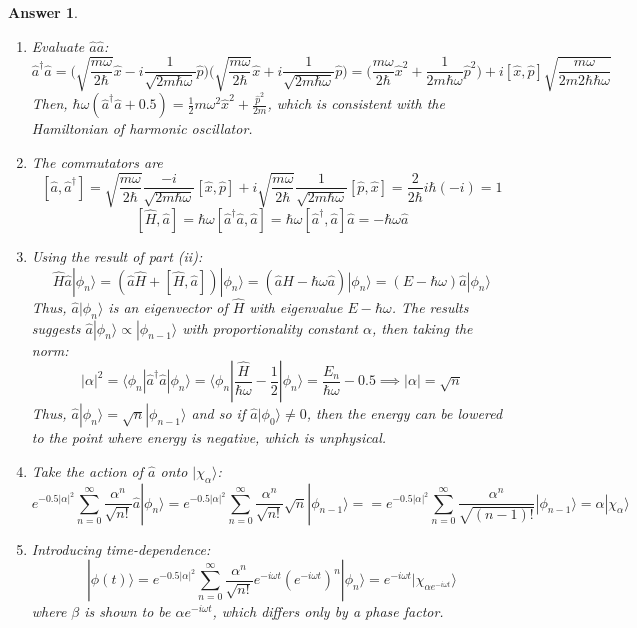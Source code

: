 \documentclass[a4paper]{article}
\newtheorem{ans}{Answer}[subsection]
\theoremstyle{new}
\begin{document}
\begin{ans}\leavevmode
\begin{enumerate}[label=(\roman*)]
\item Evaluate $\hat{a}\hat{a}$:
$$\hat{a}^\dag\hat{a}=\bigg(\sqrt{\frac{m\omega}{2\hbar}}\hat{x}-i\frac{1}{\sqrt{2m\hbar\omega}}\hat{p}\bigg)\bigg(\sqrt{\frac{m\omega}{2\hbar}}\hat{x}+i\frac{1}{\sqrt{2m\hbar\omega}}\hat{p}\bigg)=\bigg(\frac{m\omega}{2\hbar}\hat{x}^2+\frac{1}{2m\hbar\omega}\hat{p}^2\bigg)+i[\hat{x},\hat{p}]\sqrt{\frac{m\omega}{2m2\hbar\hbar\omega}}$$
Then, $\hbar\omega(\hat{a}^\dag\hat{a}+0.5)=\frac{1}{2}m\omega^2\hat{x}^2+\frac{\hat{p}^2}{2m}$, which is consistent with the Hamiltonian of harmonic oscillator.
\item The commutators are
$$[\hat{a},\hat{a}^\dag]=\sqrt{\frac{m\omega}{2\hbar}}\frac{-i}{\sqrt{2m\hbar\omega}}[\hat{x},\hat{p}]+i\sqrt{\frac{m\omega}{2\hbar}}\frac{1}{\sqrt{2m\hbar\omega}}[\hat{p},\hat{x}]=\frac{2}{2\hbar}i\hbar(-i)=1$$
$$[\hat{H},\hat{a}]=\hbar\omega[\hat{a}^\dag\hat{a},\hat{a}]=\hbar\omega[\hat{a}^\dag,\hat{a}]\hat{a}=-\hbar\omega\hat{a}$$
\item Using the result of part (ii):
$$\hat{H}\hat{a}|\phi_n\rangle=(\hat{a}\hat{H}+[\hat{H},\hat{a}])|\phi_n\rangle=(\hat{a}\hat{H}-\hbar\omega\hat{a})|\phi_n\rangle=(E-\hbar\omega)\hat{a}|\phi_n\rangle$$
Thus, $\hat{a}|\phi_n\rangle$ is an eigenvector of $\hat{H}$ with eigenvalue $E-\hbar\omega$. The results suggests $\hat{a}|\phi_n\rangle\propto|\phi_{n-1}\rangle$ with proportionality constant $\alpha$, then taking the norm:
$$|\alpha|^2=\langle \phi_n|\hat{a}^\dag\hat{a}|\phi_n\rangle=\langle \phi_n|\frac{\hat{H}}{\hbar\omega}-\frac{1}{2}|\phi_n\rangle=\frac{E_n}{\hbar\omega}-0.5\implies|\alpha|=\sqrt{n}$$
Thus, $\hat{a}|\phi_n\rangle=\sqrt{n}|\phi_{n-1}\rangle$ and so if $\hat{a}|\phi_0\rangle\neq0$, then the energy can be lowered to the point where energy is negative, which is unphysical.
\item Take the action of $\hat{a}$ onto $|\chi_\alpha\rangle$:
$$e^{-0.5|\alpha|^2}\sum_{n=0}^\infty\frac{\alpha^n}{\sqrt{n!}}\hat{a}|\phi_n\rangle=e^{-0.5|\alpha|^2}\sum_{n=0}^\infty\frac{\alpha^n}{\sqrt{n!}}\sqrt{n}|\phi_{n-1}\rangle==e^{-0.5|\alpha|^2}\sum_{n=0}^\infty\frac{\alpha^n}{\sqrt{(n-1)!}}|\phi_{n-1}\rangle=\alpha|\chi_\alpha\rangle$$
\item Introducing time-dependence:
$$|\phi(t)\rangle=e^{-0.5|\alpha|^2}\sum_{n=0}^\infty\frac{\alpha^n}{\sqrt{n!}}e^{-i\omega t}(e^{-i\omega t})^n|\phi_n\rangle=e^{-i\omega t}|\chi_{\alpha e^{-i\omega t}}\rangle$$
where $\beta$ is shown to be $\alpha e^{-i\omega t}$, which differs only by a phase factor.
\end{enumerate}
\end{ans}
\end{document}
